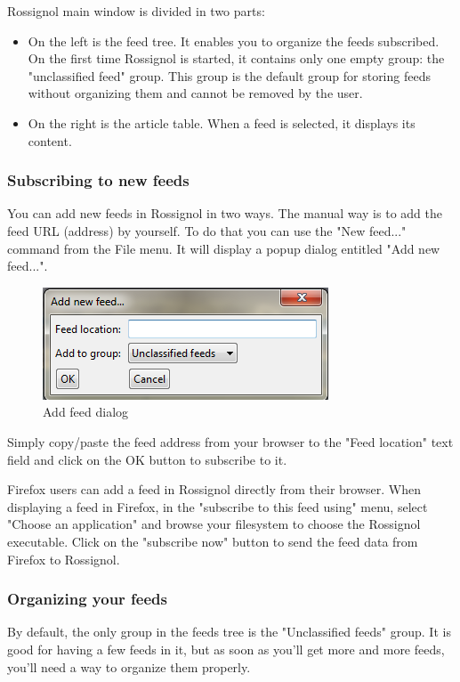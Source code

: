\documentclass[11pt]{article} %
\begin{document}
Rossignol main window is divided in two parts:
\begin{itemize}
\item On the left is the feed tree. It enables you to organize the feeds 
subscribed. On the first time Rossignol is started, it contains only one empty 
group: the "unclassified feed" group. This group is the default group for 
storing feeds without organizing them and cannot be removed by the user.
\item On the right is the article table. When a feed is selected, it displays 
its content. 
\end{itemize}

\subsubsection{Subscribing to new feeds}

You can add new feeds in Rossignol in two ways. The manual way is to add the 
feed URL (address) by yourself. To do that you can use the "New feed..." 
command from the File menu. It will display a popup dialog entitled 
"Add new feed...".

\begin{figure}[h]
\centering
\includegraphics{img/add_feed_dialog.png}
\caption{Add feed dialog}
\end{figure}

Simply copy/paste the feed address from your browser to the "Feed location" 
text field and click on the OK button to subscribe to it.

Firefox users can add a feed in Rossignol directly from their browser. 
When displaying a feed in Firefox, in the "subscribe to this feed using" menu, 
select "Choose an application" and browse your filesystem to choose the 
Rossignol executable. Click on the "subscribe now" button to send the feed data 
from Firefox to Rossignol. 

\subsubsection{Organizing your feeds}

By default, the only group in the feeds tree is the "Unclassified feeds" group. 
It is good for having a few feeds in it, but as soon as you'll get more and more
feeds, you'll need a way to organize them properly.
\end{document}
